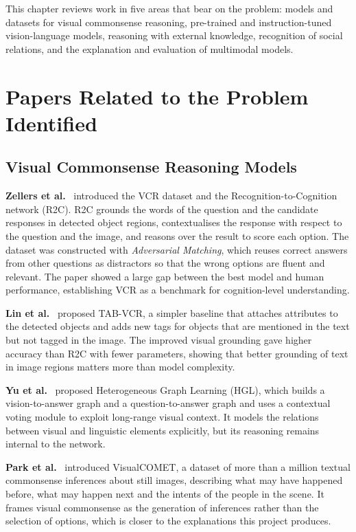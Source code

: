 \documentclass[12pt,a4paper,oneside]{report}
\begin{document}
This chapter reviews work in five areas that bear on the problem: models and
datasets for visual commonsense reasoning, pre-trained and instruction-tuned
vision-language models, reasoning with external knowledge, recognition of
social relations, and the explanation and evaluation of multimodal models.

\section{Papers Related to the Problem Identified}

\subsection{Visual Commonsense Reasoning Models}

\textbf{Zellers et al.}~\cite{zellers2019vcr} introduced the VCR dataset and the
Recognition-to-Cognition network (R2C). R2C grounds the words of the question
and the candidate responses in detected object regions, contextualises the
response with respect to the question and the image, and reasons over the
result to score each option. The dataset was constructed with
\emph{Adversarial Matching}, which reuses correct answers from other questions
as distractors so that the wrong options are fluent and relevant. The paper
showed a large gap between the best model and human performance, establishing
VCR as a benchmark for cognition-level understanding.

\textbf{Lin et al.}~\cite{lin2019tabvcr} proposed TAB-VCR, a simpler baseline
that attaches attributes to the detected objects and adds new tags for objects
that are mentioned in the text but not tagged in the image. The improved visual
grounding gave higher accuracy than R2C with fewer parameters, showing that
better grounding of text in image regions matters more than model complexity.

\textbf{Yu et al.}~\cite{yu2019hgl} proposed Heterogeneous Graph Learning (HGL),
which builds a vision-to-answer graph and a question-to-answer graph and uses a
contextual voting module to exploit long-range visual context. It models the
relations between visual and linguistic elements explicitly, but its reasoning
remains internal to the network.

\textbf{Park et al.}~\cite{park2020visualcomet} introduced VisualCOMET, a
dataset of more than a million textual commonsense inferences about still
images, describing what may have happened before, what may happen next and the
intents of the people in the scene. It frames visual commonsense as the
generation of inferences rather than the selection of options, which is closer
to the explanations this project produces.
\end{document}
